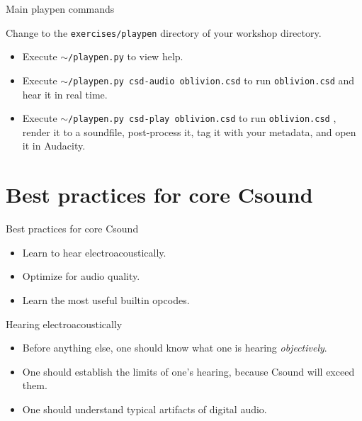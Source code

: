\documentclass{beamer}
\begin{document}
\begin{frame}{Main playpen commands}
\begin{example}
Change to the \texttt{exercises/playpen} directory of your workshop directory.
\begin{itemize}
\item Execute \texttt{$\sim$/playpen.py} to view help.
\item Execute \texttt{$\sim$/playpen.py csd-audio oblivion.csd} to run \texttt{oblivion.csd} and hear it in real time.
\item Execute \texttt{$\sim$/playpen.py csd-play oblivion.csd} to run \texttt{oblivion.csd} , render it to a soundfile, post-process it, tag it with your metadata, and open it in Audacity.
\end{itemize}
\end{example}
\end{frame}

\section{Best practices for core Csound}
\begin{frame}{Best practices for core Csound}
\begin{itemize}
\item Learn to hear electroacoustically.
\item Optimize for audio quality.
\item Learn the most useful builtin opcodes.
\end{itemize}
\end{frame}

\begin{frame}{Hearing electroacoustically}
\begin{itemize}
\item Before anything else, one should know what one is hearing \textit{objectively}.
\item One should establish the limits of one's hearing, because Csound will exceed them.
\item One should understand typical artifacts of digital audio.
\end{itemize}
\end{frame}
\end{document}
